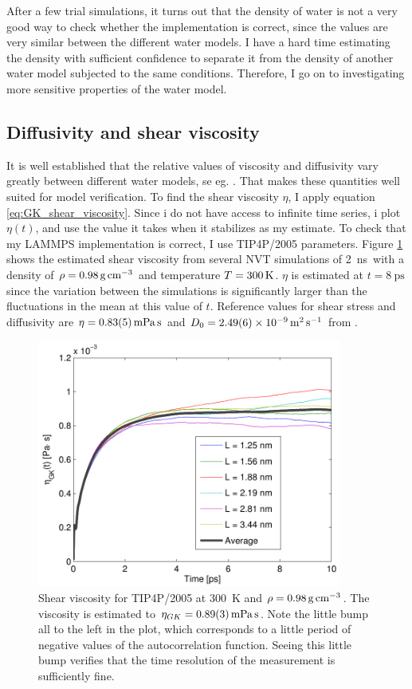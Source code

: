 After a few trial simulations, it turns out that the density of water is not a very good way to check whether the implementation is correct, since the values are very similar between the different water models. I have a hard time estimating the density with sufficient confidence to separate it from the density of another water model subjected to the same conditions. Therefore, I go on to investigating more sensitive properties of the water model.

\subsection{Diffusivity and shear viscosity}
It is well established that the relative values of viscosity and diffusivity vary greatly between different water models, se eg. \cite{Gonzalez2010,Tazi2012}. That makes these quantities well suited for model verification. To find the shear viscosity $\eta$, I apply equation \ref{eq:GK_shear_viscosity}. Since i do not have access to infinite time series, i plot $\eta(t)$, and use the value it takes when it stabilizes as my estimate. To check that my LAMMPS implementation is correct, I use TIP4P/2005 parameters.  Figure \ref{fig:shear_viscosity_tip4p/2005} shows the estimated shear viscosity from several NVT simulations of \SI{2}{\nano\second} with a density of $\rho = \text{\SI{0.98}{\gram\per\cubic\cm}}$ and temperature $T=\text{\SI{300}{\kelvin}}$. $\eta$ is estimated at $t = \SI{8}{\pico\second}$ since the variation between the simulations is significantly larger than the fluctuations in the mean at this value of $t$. Reference values for shear stress and diffusivity are $\eta = \text{\SI{0.83 \pm 0.05}{\milli\pascal\second}}$ and $D_0 = \text{\SI{2.49 \pm 0.06d-9}{\metre\squared\per\second}}$ from \cite{Tazi2012}.

\begin{figure}
\centering
\includegraphics[width=10cm]{../figures/thesis/viscosity_green_kubo_tip4p_2005.pdf}
\caption{Shear viscosity for TIP4P/2005 at \SI{300}{\kelvin} and $\rho = \text{\SI{0.98}{\gram\per\cubic\cm}}$. The viscosity is estimated to $\eta_{GK} = \text{\SI{0.89\pm0.03}{\milli\pascal\second}}$. Note the little bump all to the left in the plot, which corresponds to a little period of negative values of the autocorrelation function. Seeing this little bump verifies that the time resolution of the measurement is sufficiently fine.}
\label{fig:shear_viscosity_tip4p/2005}
\end{figure}

